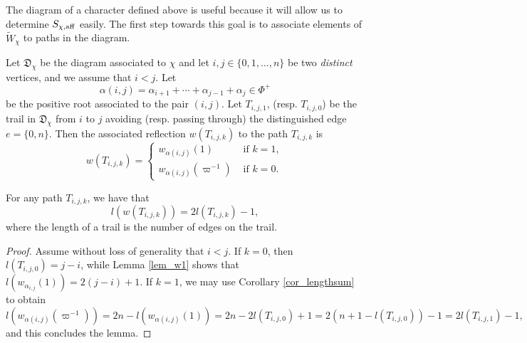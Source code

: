     The diagram of a character defined above is useful because it will allow us to determine $S_{\chi,\mathrm{aff}}$ easily. The first step towards this goal is to associate elements of $\widetilde{W}_\chi$ to paths in the diagram.

    \begin{definition}
        Let $\mathfrak{D}_\chi$ be the diagram associated to $\chi$ and let $i,j\in\{0,1,\ldots,n\}$ be two \textit{distinct} vertices, and we assume that $i<j$. Let 
        $$\alpha(i,j)=\alpha_{i+1}+\cdots+\alpha_{j-1}+\alpha_j\in\Phi^+$$
        be the positive root associated to the pair $(i,j)$. Let $T_{i,j,1}$, (resp. $T_{i,j,0}$) be the trail in $\mathfrak{D}_\chi$ from $i$ to $j$ avoiding (resp. passing through) the distinguished edge $e=\{0,n\}$. Then the associated reflection $w(T_{i,j,k})$ to the path $T_{i,j,k}$ is
        \begin{equation*}
            w(T_{i,j,k})=
            \begin{cases}
                w_{\alpha(i,j)}(1) &\text{ if } k=1,\\
                w_{\alpha(i,j)}(\varpi^{-1}) &\text{ if } k=0.
            \end{cases}
        \end{equation*}
    \end{definition}

    \begin{lemma}
        For any path $T_{i,j,k}$, we have that 
        $$l(w(T_{i,j,k}))=2l(T_{i,j,k})-1,$$
        where the length of a trail is the number of edges on the trail.
    \end{lemma}
    \begin{proof}
        Assume without loss of generality that $i<j$. 
        If $k=0$, then $l(T_{i,j,0})=j-i$, while Lemma \ref{lem_w1} shows that $l(w_{\alpha_{i,j}}(1))=2(j-i)+1$. If $k=1$, we may use Corollary \ref{cor_lengthsum} to obtain
        $$l(w_{\alpha(i,j)}(\varpi^{-1}))=2n-l(w_{\alpha(i,j)}(1))=2n-2l(T_{i,j,0})+1=2(n+1-l(T_{i,j,0}))-1=2l(T_{i,j,1})-1,$$
        and this concludes the lemma.
    \end{proof}

